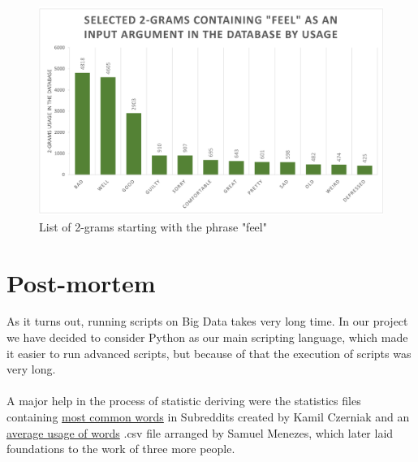 \documentclass[openany]{article}
\begin{document}
\begin{figure}[H]
    \centering
    \includegraphics[width=\textwidth]{feel.pdf}
    \caption{List of 2-grams starting with the phrase "feel"}
    \label{fig:mesh1}
\end{figure}

\section{Post-mortem}
As it turns out, running scripts on Big Data takes very long time. In our project we have decided to consider Python as our main scripting language, which made it easier to run advanced scripts, but because of that the execution of scripts was very long.\\ \\
A major help in the process of statistic deriving were the statistics files containing  \href{https://drive.google.com/file/d/1_bkH21F-ifAVhdobl4DU-Rr_UDUYsjm0/view?usp=sharing}{most common words} in Subreddits created by Kamil Czerniak and an \href{https://drive.google.com/drive/folders/1izGHyl-19wRL2TkJFYoMKktoBgXTJ6yb}{average usage of words} .csv file arranged by Samuel Menezes, which later laid foundations to the work of three more people.
\end{document}

